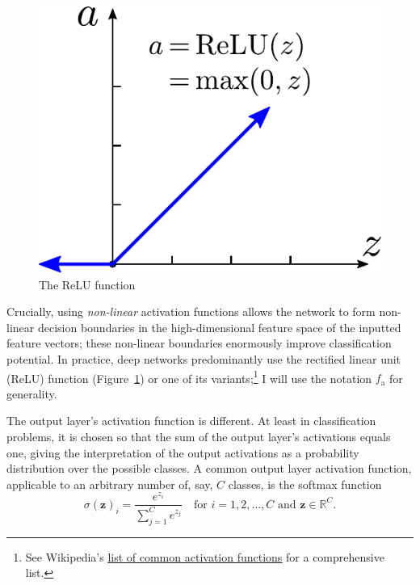 \documentclass[11pt, a4paper]{article}
\renewcommand{\vec}[1]{\bm{#1}}
\begin{document}
\begin{figure}
    \centering
    \includegraphics[width=\linewidth]{vector/relu.pdf}
    \caption{The ReLU function}
    \label{fig:relu}
\end{figure}
Crucially, using \textit{non-linear} activation functions allows the network to form non-linear decision boundaries in the high-dimensional feature space of the inputted feature vectors; these non-linear boundaries enormously improve classification potential.
In practice, deep networks predominantly use the rectified linear unit (ReLU) function (Figure~\ref{fig:relu}) or one of its variants;\footnote{See Wikipedia's \href{https://en.wikipedia.org/wiki/Activation_function\#Comparison_of_activation_functions}{\underline{list of common activation functions}} for a comprehensive list.} I will use the notation $ f_{\text{a}} $ for generality.

The output layer's activation function is different.
At least in classification problems, it is chosen so that the sum of the output layer's activations equals one, giving the interpretation of the output activations as a probability distribution over the possible classes.
A common output layer activation function, applicable to an arbitrary number of, say, $ C $ classes, is the softmax function
\begin{equation}
    \sigma (\vec{z})_{i} = \frac{e^{z_{i}}}{\sum_{j = 1}^{C}e^{z_{j}}} \quad \text{for } i = 1, 2, \ldots, C \text{ and } \vec{z} \in \mathbb{R}^{C}. \label{eq:softmax}
\end{equation}
\end{document}
